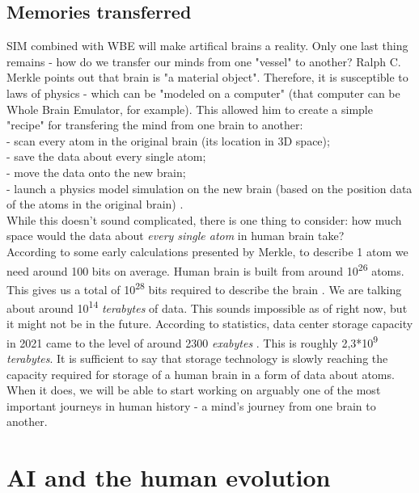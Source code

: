 \documentclass[12pt]{article}
\begin{document}
\subsection{Memories transferred}
	SIM combined with WBE will make artifical brains a reality. Only one last thing remains - how do we transfer our minds from one "vessel" to another? Ralph C. Merkle points out that brain is "a material object". Therefore, it is susceptible to laws of physics - which can be "modeled on a computer" \cite{uploading:1} (that computer can be Whole Brain Emulator, for example). This allowed him to create a simple "recipe" for transfering the mind from one brain to another:
	\\- scan every atom in the original brain (its location in 3D space);
	\\- save the data about every single atom;
	\\- move the data onto the new brain;
	\\- launch a physics model simulation on the new brain (based on the position data of the atoms in the original brain) \cite{uploading:1}.
	\\While this doesn't sound complicated, there is one thing to consider: how much space would the data about \emph{every single atom} in human brain take? 
	\\According to some early calculations presented by Merkle, to describe 1 atom we need around 100 bits on average. Human brain is built from around 10\textsuperscript{26} atoms. This gives us a total of 10\textsuperscript{28} bits required to describe the brain \cite{uploading:1}. We are talking about around 10\textsuperscript{14} \emph{terabytes} of data. This sounds impossible as of right now, but it might not be in the future. According to statistics, data center storage capacity in 2021 came to the level of around 2300 \emph{exabytes} \cite{statista:capacity}. This is roughly 2,3*10\textsuperscript{9} \emph{terabytes}. It is sufficient to say that storage technology is slowly reaching the capacity required for storage of a human brain in a form of data about atoms. When it does, we will be able to start working on arguably one of the most important journeys in human history - a mind's journey from one brain to another.
\section{AI and the human evolution}
\end{document}
